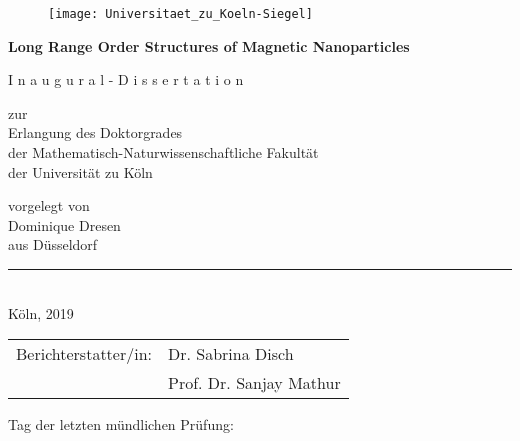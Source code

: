 \begin{titlepage}
  \begin{center}
    \begin{figure}[H]
      \centering
      \texttt{[image: Universitaet\_zu\_Koeln-Siegel]}
    \end{figure}
    \LARGE\textbf{Long Range Order Structures of Magnetic Nanoparticles}

    \vspace{2cm}

    \Large{I n a u g u r a l - D i s s e r t a t i o n } \\

    \vspace{2cm}

    \large{zur}\\
    \large{Erlangung des Doktorgrades}\\
    \large{der Mathematisch-Naturwissenschaftliche Fakult\"at}\\
    \large der Universit\"at zu K\"oln\\

    \vspace{2cm}

    \large{vorgelegt von}\\
    \large{Dominique Dresen}\\
    \large{aus D\"usseldorf}\\

    \vspace{2cm}

    \noindent\rule{14cm}{0.4pt}\\
    \normalsize{Köln, 2019}\\
  \end{center}
\end{titlepage}

\newpage


\vspace{2cm}

\begin{tabular}{@{}ll}
  Berichterstatter/in: & Dr. Sabrina Disch \\
                       & Prof. Dr. Sanjay Mathur
\end{tabular}

\medskip
\vspace{2cm}

Tag der letzten mündlichen Prüfung:



